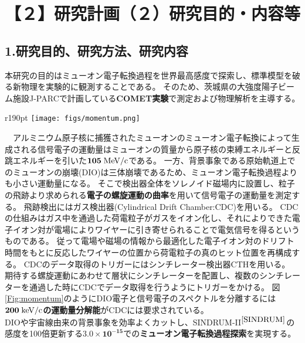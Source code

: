 \documentclass[11pt,a4j,dvipdfmx]{jarticle} 					%
\newcommand{\研究課題名}{COMET Phase-Iに向けたエンジニアリングランおよびその物理解析}
\newcommand{\研究機関名}{大阪大学}
\newcommand{\研究代表者氏名}{高見 翔太   }
\newcommand{\mysubsection}[1]{\vspace{-20pt}\subsection*{\colorbox{cyan!15}{\normalsize{#1}}}\vspace{-0.2cm}}
\begin{document}
\section{【２】研究計画（２）研究目的・内容等}
\mysubsection{1.研究目的、研究方法、研究内容}
本研究の目的はミューオン電子転換過程を世界最高感度で探索し、標準模型を破る新物理を実験的に観測することである。
そのため、茨城県の大強度陽子ビーム施設J-PARCで計画している\textbf{COMET実験}で測定および物理解析を主導する。\\
\begin{wrapfigure}[12]{r}{190pt}{}
	\centering
	 \vspace{-1.2cm}
	 \hspace*{-15pt}
	 \texttt{[image: figs/momentum.png]}
	 \vspace{-1.0cm}
	 \caption{\small{信号電子の運動量分布}}
	 \label{Fig:momentum}
	\end{wrapfigure} 
　アルミニウム原子核に捕獲されたミューオンのミューオン電子転換によって生成される信号電子の運動量はミューオンの質量から原子核の束縛エネルギーと反跳エネルギーを引いた$\mathbf{105\;\rm{MeV/c}}$である。
一方、背景事象である原始軌道上でのミューオンの崩壊(DIO)は三体崩壊であるため、ミューオン電子転換過程よりも小さい運動量になる。
そこで検出器全体をソレノイド磁場内に設置し、粒子の飛跡より求められる\textbf{電子の螺旋運動の曲率}を用いて信号電子の運動量を測定する。
飛跡検出にはガス検出器(Cylindrical Drift Chamber:CDC)を用いる。
CDCの仕組みはガス中を通過した荷電粒子がガスをイオン化し、それによりできた電子イオン対が電場によりワイヤーに引き寄せられることで電気信号を得るというものである。
従って電場や磁場の情報から最適化した電子イオン対のドリフト時間をもとに反応したワイヤーの位置から荷電粒子の真のヒット位置を再構成する。
CDCのデータ取得のトリガーにはシンチレーター検出器CTHを用いる。
期待する螺旋運動にあわせて層状にシンチレーターを配置し、複数のシンチレーターを通過した時にCDCでデータ取得を行うようにトリガーをかける。
図\ref{Fig:momentum}のようにDIO電子と信号電子のスペクトルを分離するには$\mathbf{200\;\rm{keV/c}}$\textbf{の運動量分解能}がCDCには要求されている。\\
DIOや宇宙線由来の背景事象を効率よくカットし、\mbox{SINDRUM-I\hspace{-1.2pt}I$^{\cite{SINDRUM}}$}の感度を100倍更新する$\mathbf{3.0 \times 10^{-15}}$での\textbf{ミューオン電子転換過程探索}を実現する。\\
\end{document}
